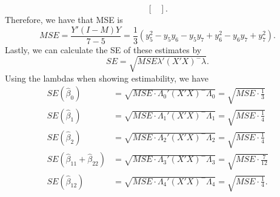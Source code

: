\documentclass[11pt]{article}
\begin{document}
\begin{itemize}
\[\begin{bmatrix}
\end{bmatrix}.
\]
Therefore, we have that MSE is
\[
MSE = \frac{Y'(I-M)Y}{7-5} = \frac{1}{3}(y_5^2 - y_5y_6 - y_5y_7 + y_6^2 - y_6y_7 + y_7^2).
\]
Lastly, we can calculate the SE of these estimates by
\[
SE = \sqrt{MSE\lambda'(X'X)^-\lambda}.
\]
Using the lambdas when showing estimability, we have
\begin{align*}
SE\left(\widehat{\beta}_0\right) &= \sqrt{MSE\cdot\Lambda_0'(X'X)^-\Lambda_0} = \sqrt{MSE\cdot\frac{1}{3}} \\
SE\left(\widehat{\beta}_1\right) &= \sqrt{MSE\cdot\Lambda_1'(X'X)^-\Lambda_1} = \sqrt{MSE\cdot \frac{1}{4}} \\
SE\left(\widehat{\beta}_2\right) &= \sqrt{MSE\cdot\Lambda_2'(X'X)^-\Lambda_2} = \sqrt{MSE\cdot\frac{1}{4}} \\
SE\left(\widehat{\beta}_{11}+\widehat{\beta}_{22}\right) &= \sqrt{MSE\cdot\Lambda_3'(X'X)^-\Lambda_3} = \sqrt{MSE\cdot\frac{7}{12}}\\
SE\left(\widehat{\beta}_{12}\right) &= \sqrt{MSE\cdot\Lambda_4'(X'X)^-\Lambda_4} = \sqrt{MSE\cdot\frac{1}{4}}. \\
\end{align*}
\end{itemize}
\end{document}
